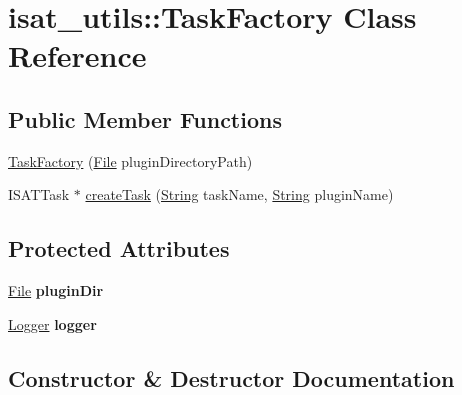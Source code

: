 \hypertarget{classisat__utils_1_1_task_factory}{}\section{isat\+\_\+utils\+:\+:Task\+Factory Class Reference}
\label{classisat__utils_1_1_task_factory}
\subsection*{Public Member Functions}
\begin{DoxyCompactItemize}
\item 
\hyperlink{classisat__utils_1_1_task_factory_a0e5b385029369df726e5d1640502d65d}{Task\+Factory} (\hyperlink{classisat__utils_1_1_file}{File} plugin\+Directory\+Path)
\item 
I\+S\+A\+T\+Task $\ast$ \hyperlink{classisat__utils_1_1_task_factory_aab7bb04112a9a47383b8c08bef56bf20}{create\+Task} (\hyperlink{classisat__utils_1_1_string}{String} task\+Name, \hyperlink{classisat__utils_1_1_string}{String} plugin\+Name)
\end{DoxyCompactItemize}
\subsection*{Protected Attributes}
\begin{DoxyCompactItemize}
\item 
\hyperlink{classisat__utils_1_1_file}{File} {\bfseries plugin\+Dir}\hypertarget{classisat__utils_1_1_task_factory_ab1e529c2ca3de47b918fb809f2de9697}{}\label{classisat__utils_1_1_task_factory_ab1e529c2ca3de47b918fb809f2de9697}

\item 
\hyperlink{classisat__utils_1_1_logger}{Logger} {\bfseries logger}\hypertarget{classisat__utils_1_1_task_factory_a14f2d0cb28d3afcf26be4bf2180a3bfa}{}\label{classisat__utils_1_1_task_factory_a14f2d0cb28d3afcf26be4bf2180a3bfa}

\end{DoxyCompactItemize}


\subsection{Constructor \& Destructor Documentation}
